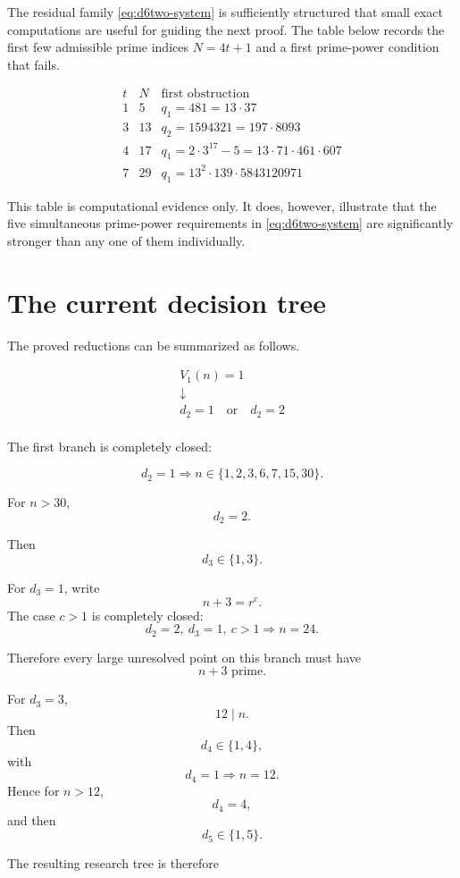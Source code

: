 \documentclass[11pt]{article}
\begin{document}
The residual family \eqref{eq:d6two-system} is sufficiently structured that
small exact computations are useful for guiding the next proof.  The table
below records the first few admissible prime indices $N=4t+1$ and a first
prime-power condition that fails.

\[
\begin{array}{c|c|l}
 t&N&\text{first obstruction}\\
\hline
1&5&q_1=481=13\cdot37\\
3&13&q_2=1594321=197\cdot8093\\
4&17&q_1=2\cdot3^{17}-5=13\cdot71\cdot461\cdot607\\
7&29&q_1=13^2\cdot139\cdot5843120971
\end{array}
\]

This table is computational evidence only.  It does, however, illustrate
that the five simultaneous prime-power requirements in
\eqref{eq:d6two-system} are significantly stronger than any one of them
individually.

\section{The current decision tree}

The proved reductions can be summarized as follows.

\[
\begin{array}{c}
V_1(n)=1\\[1mm]
\downarrow\\
d_2=1\quad\text{or}\quad d_2=2\\
\end{array}
\]

The first branch is completely closed:

\[
\boxed{
d_2=1
\Longrightarrow
n\in\{1,2,3,6,7,15,30\}.
}
\]

For \(n>30\),
\[
d_2=2.
\]

Then
\[
d_3\in\{1,3\}.
\]

For \(d_3=1\), write
\[
n+3=r^c.
\]
The case \(c>1\) is completely closed:
\[
\boxed{
d_2=2,\ d_3=1,\ c>1
\Longrightarrow n=24.
}
\]

Therefore every large unresolved point on this branch must have
\[
\boxed{n+3\text{ prime}.}
\]

For \(d_3=3\),
\[
12\mid n.
\]
Then
\[
d_4\in\{1,4\},
\]
with
\[
d_4=1\Longrightarrow n=12.
\]
Hence for \(n>12\),
\[
d_4=4,
\]
and then
\[
d_5\in\{1,5\}.
\]

The resulting research tree is therefore
\end{document}
